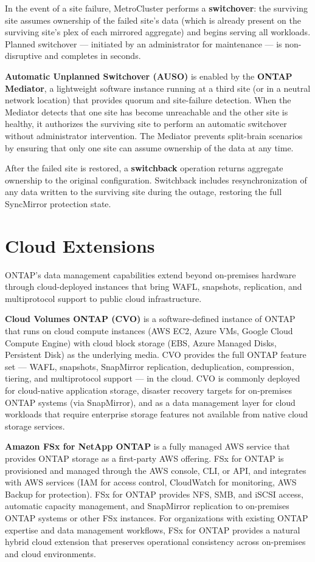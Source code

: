 In the event of a site failure, MetroCluster performs a \textbf{switchover}: the surviving site assumes ownership of the failed site's data (which is already present on the surviving site's plex of each mirrored aggregate) and begins serving all workloads. Planned switchover --- initiated by an administrator for maintenance --- is non-disruptive and completes in seconds.

\textbf{Automatic Unplanned Switchover (AUSO)} is enabled by the \textbf{ONTAP Mediator}, a lightweight software instance running at a third site (or in a neutral network location) that provides quorum and site-failure detection. When the Mediator detects that one site has become unreachable and the other site is healthy, it authorizes the surviving site to perform an automatic switchover without administrator intervention. The Mediator prevents split-brain scenarios by ensuring that only one site can assume ownership of the data at any time.

After the failed site is restored, a \textbf{switchback} operation returns aggregate ownership to the original configuration. Switchback includes resynchronization of any data written to the surviving site during the outage, restoring the full SyncMirror protection state.

\section{Cloud Extensions}

ONTAP's data management capabilities extend beyond on-premises hardware through cloud-deployed instances that bring WAFL, snapshots, replication, and multiprotocol support to public cloud infrastructure.

\textbf{Cloud Volumes ONTAP (CVO)} is a software-defined instance of ONTAP that runs on cloud compute instances (AWS EC2, Azure VMs, Google Cloud Compute Engine) with cloud block storage (EBS, Azure Managed Disks, Persistent Disk) as the underlying media. CVO provides the full ONTAP feature set --- WAFL, snapshots, SnapMirror replication, deduplication, compression, tiering, and multiprotocol support --- in the cloud. CVO is commonly deployed for cloud-native application storage, disaster recovery targets for on-premises ONTAP systems (via SnapMirror), and as a data management layer for cloud workloads that require enterprise storage features not available from native cloud storage services.

\textbf{Amazon FSx for NetApp ONTAP} is a fully managed AWS service that provides ONTAP storage as a first-party AWS offering. FSx for ONTAP is provisioned and managed through the AWS console, CLI, or API, and integrates with AWS services (IAM for access control, CloudWatch for monitoring, AWS Backup for protection). FSx for ONTAP provides NFS, SMB, and iSCSI access, automatic capacity management, and SnapMirror replication to on-premises ONTAP systems or other FSx instances. For organizations with existing ONTAP expertise and data management workflows, FSx for ONTAP provides a natural hybrid cloud extension that preserves operational consistency across on-premises and cloud environments.

